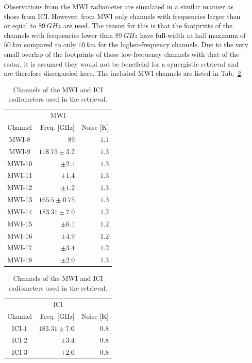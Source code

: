 \documentclass[journal abbreviation, manuscript]{copernicus}
\begin{document}
Observations from the MWI radiometer are simulated in a similar manner as those
from ICI. However, from MWI only channels with frequencies larger than or equal
to $89\ \unit{GHz}$ are used. The reason for this is that the footprints of the
channels with frequencies lower than $89\ \unit{GHz}$ have full-width at half
maximum of $50\ \unit{km}$ compared to only $10\ \unit{km}$ for the
higher-frequency channels. Due to the very small overlap of the footprints of
these low-frequency channels with that of the radar, it is assumed they would
not be beneficial for a synergistic retrieval and are therefore disregarded
here. The included MWI channels are listed in Tab.~\ref{tab:channels}.

\begin{table}[hbpt]
\caption{Channels of the MWI and ICI radiometers used in the retrieval.}
\label{tab:channels}
    \begin{tabular}{c|r|r}
    \multicolumn{3}{c}{MWI}\\
    Channel & Freq. [GHz] & Noise [K]\\
    \hline
    MWI-8  & $89$              & $1.1$ \\
    MWI-9  & $118.75 \pm 3.2$  & $1.3$ \\
    MWI-10 & $\pm 2.1$         & $1.3$ \\
    MWI-11 & $\pm 1.4$         & $1.3$ \\
    MWI-12 & $\pm 1.2$         & $1.3$ \\
    MWI-13 & $165.5 \pm 0.75$  & $1.3$ \\
    MWI-14 & $183.31 \pm 7.0$  & $1.2$ \\
    MWI-15 & $ \pm 6.1$        & $1.2$ \\
    MWI-16 & $ \pm 4.9$        & $1.2$ \\
    MWI-17 & $ \pm 3.4$        & $1.2$ \\
    MWI-18 & $ \pm 2.0$        & $1.3$ \\
    \end{tabular}%
    \hspace{1cm}%
    \begin{tabular}{c|r|r}
    \multicolumn{3}{c}{ICI}\\
    Channel & Freq. [GHz] & Noise [K] \\
    \hline
    ICI-1  & $183.31 \pm 7.0$ & $0.8$\\
    ICI-2  & $       \pm 3.4$ & $0.8$\\
    ICI-3  & $       \pm 2.0$ & $0.8$\\

\end{tabular}
\end{table}
\end{document}
